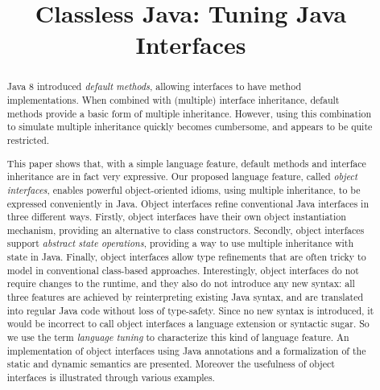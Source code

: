 \documentclass[a4paper,UKenglish]{lipics}
\title{Classless Java: Tuning Java Interfaces}
\author[1]{}
\begin{document}
\maketitle

\begin{abstract}

Java 8 introduced \emph{default methods}, allowing interfaces to
have method implementations. When combined with (multiple) interface
inheritance, default methods provide a basic form of multiple
inheritance. However, using this combination to simulate multiple
inheritance quickly becomes cumbersome, and appears to be quite
restricted.

This paper shows that, with a simple language feature, default methods
and interface inheritance are in fact very expressive. Our proposed
language feature, called \emph{object interfaces}, enables powerful
object-oriented idioms, using multiple inheritance, to be expressed
conveniently in Java. Object interfaces refine conventional Java
interfaces in three different ways. Firstly, object interfaces have
their own object instantiation mechanism, providing an alternative to
class constructors. Secondly, object interfaces support \emph{abstract
  state operations}, providing a way to use multiple inheritance with
state in Java. Finally, object interfaces allow type refinements that
are often tricky to model in conventional class-based
approaches. Interestingly, object interfaces do not require changes to
the runtime, and they also do not introduce any new syntax: all three
features are achieved by reinterpreting existing Java syntax, and are
translated into regular Java code without loss of type-safety. Since
no new syntax is introduced, it would be incorrect to call object
interfaces a language extension or syntactic sugar. So we use the term
\emph{language tuning} to characterize this kind of language
feature. An implementation of object interfaces using Java annotations
and a formalization of the static and dynamic semantics are
presented. Moreover the usefulness of object interfaces is illustrated
through various examples.

\end{abstract}


\end{document}
